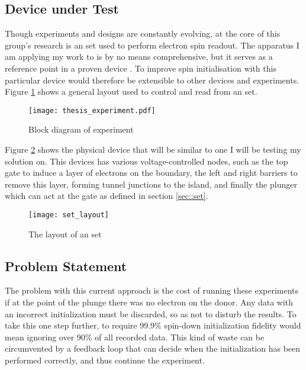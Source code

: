 \label{sec::real-time}
\subsection{Device under Test}
\label{sec::experiment}
Though experiments and designs are constantly evolving, at the core of this group's research is an \gls{set} used to perform electron spin readout. The apparatus I am applying my work to is by no means comprehensive, but it serves as a reference point in a proven device \cite{morello2010single}. To improve spin initialisation with this particular device would therefore be extensible to other devices and experiments.
Figure \ref{fig::thesis_experiment} shows a general layout used to control and read from an \gls{set}.

\begin{figure}[htbp!]
	\centering
	\texttt{[image: thesis\_experiment.pdf]}
	\caption{Block diagram of experiment}
	\label{fig::thesis_experiment}
\end{figure}


Figure \ref{fig::set_layout} shows the physical device that will be similar to one I will be testing my solution on. This devices has various voltage-controlled nodes, such as the top gate to induce a layer of electrons on the boundary, the left and right barriers to remove this layer, forming tunnel junctions to the island, and finally the plunger which can act at the gate as defined in section \ref{sec::set}.

\begin{figure}[htbp!]
	\centering
	\texttt{[image: set\_layout]}
	\caption[Layout of an \gls{set}]{The layout of an \gls{set}\cite{morello2010single}}
	\label{fig::set_layout}
\end{figure}

\subsection{Problem Statement}
The problem with this current approach is the cost of running these experiments if at the point of the plunge there was no electron on the donor. Any data with an incorrect initialization must be discarded, so as not to disturb the results. To take this one step further, to require 99.9\% spin-down initialization fidelity would mean ignoring over 90\% of all recorded data. This kind of waste can be circumvented by a feedback loop that can decide when the initialization has been performed correctly, and thus continue the experiment.

